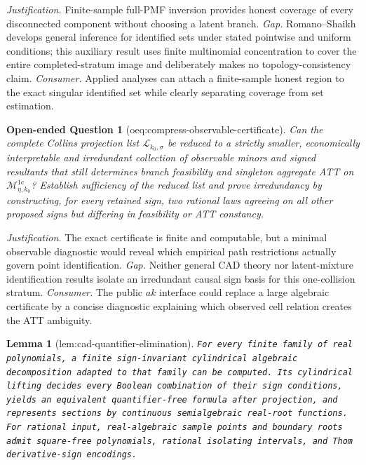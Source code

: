 \documentclass{article}
\newtheorem{lemma}{Lemma}
\newtheorem{openendedquestion}{Open-ended Question}
\begin{document}
\par\smallskip\noindent \textit{Justification.} Finite-sample full-PMF inversion provides honest coverage of every disconnected component without choosing a latent branch. \textit{Gap.} Romano--Shaikh develops general inference for identified sets under stated pointwise and uniform conditions; this auxiliary result uses finite multinomial concentration to cover the entire completed-stratum image and deliberately makes no topology-consistency claim. \textit{Consumer.} Applied analyses can attach a finite-sample honest region to the exact singular identified set while clearly separating coverage from set estimation.

\begin{openendedquestion}[oeq:compress-observable-certificate]\label{oeq:compress-observable-certificate}
Can the complete Collins projection list \(\mathscr L_{k_0,\sigma}\) be reduced to a strictly smaller, economically interpretable and irredundant collection of observable minors and signed resultants that still determines branch feasibility and singleton aggregate ATT on \(\mathcal M_{\eta,k_0}^{1\mathrm c}\)? Establish sufficiency of the reduced list and prove irredundancy by constructing, for every retained sign, two rational laws agreeing on all other proposed signs but differing in feasibility or ATT constancy.
\end{openendedquestion}
\par\smallskip\noindent \textit{Justification.} The exact certificate is finite and computable, but a minimal observable diagnostic would reveal which empirical path restrictions actually govern point identification. \textit{Gap.} Neither general CAD theory nor latent-mixture identification results isolate an irredundant causal sign basis for this one-collision stratum. \textit{Consumer.} The public \(ak\) interface could replace a large algebraic certificate by a concise diagnostic explaining which observed cell relation creates the ATT ambiguity.

\begin{lemma}[lem:cad-quantifier-elimination]\label{lem:cad-quantifier-elimination}
\texttt{For every finite family of real polynomials,\allowbreak{} a finite sign-\allowbreak{}invariant cylindrical algebraic decomposition adapted to that family can be computed. Its cylindrical lifting decides every Boolean combination of their sign conditions,\allowbreak{} yields an equivalent quantifier-\allowbreak{}free formula after projection,\allowbreak{} and represents sections by continuous semialgebraic real-\allowbreak{}root functions. For rational input,\allowbreak{} real-\allowbreak{}algebraic sample points and boundary roots admit square-\allowbreak{}free polynomials,\allowbreak{} rational isolating intervals,\allowbreak{} and Thom derivative-\allowbreak{}sign encodings.}
\end{lemma}
\end{document}
